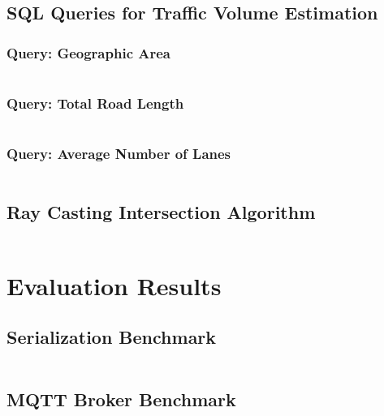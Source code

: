 \section{SQL Queries for Traffic Volume Estimation}
\label{sec:appendix:source_code:traffic_volume}

\subsection{Query: Geographic Area}
\inputminted[fontsize=\footnotesize]{sql}{97_listings/traffic_volume_1.sql}

\subsection{Query: Total Road Length}
\inputminted[fontsize=\footnotesize]{sql}{97_listings/traffic_volume_2.sql}

\subsection{Query: Average Number of Lanes}
\inputminted[fontsize=\footnotesize]{sql}{97_listings/traffic_volume_3.sql}

\section{Ray Casting Intersection Algorithm}
\label{sec:appendix:source_code:ray_casting_intersection_algorithm}
\inputminted[fontsize=\footnotesize]{c++}{97_listings/raycast.cu}

\chapter{Evaluation Results}
\section{Serialization Benchmark}
\label{sec:appendix:evaluation_results:serialization_benchmark}
\inputminted[fontsize=\footnotesize]{text}{97_listings/serialization_evaluation.txt}

\section{MQTT Broker Benchmark}
\label{sec:appendix:evaluation_results:mqtt_broker_benchmark}
\inputminted[fontsize=\footnotesize]{text}{97_listings/mqtt_bench.txt}